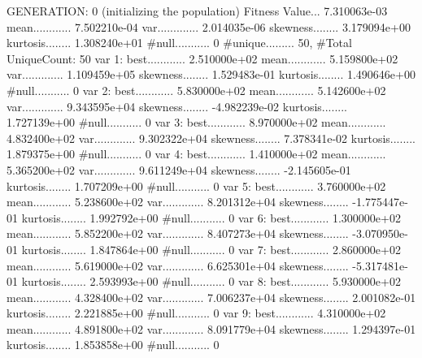 \documentclass[oneside,letterpaper,titlepage]{article}
\begin{document}
\begin{Schunk}
\begin{Soutput}
GENERATION: 0 (initializing the population)
Fitness Value... 7.310063e-03
mean............ 7.502210e-04
var............. 2.014035e-06
skewness........ 3.179094e+00
kurtosis........ 1.308240e+01
#null........... 0
#unique......... 50, #Total UniqueCount: 50
var 1:
best............ 2.510000e+02
mean............ 5.159800e+02
var............. 1.109459e+05
skewness........ 1.529483e-01
kurtosis........ 1.490646e+00
#null........... 0
var 2:
best............ 5.830000e+02
mean............ 5.142600e+02
var............. 9.343595e+04
skewness........ -4.982239e-02
kurtosis........ 1.727139e+00
#null........... 0
var 3:
best............ 8.970000e+02
mean............ 4.832400e+02
var............. 9.302322e+04
skewness........ 7.378341e-02
kurtosis........ 1.879375e+00
#null........... 0
var 4:
best............ 1.410000e+02
mean............ 5.365200e+02
var............. 9.611249e+04
skewness........ -2.145605e-01
kurtosis........ 1.707209e+00
#null........... 0
var 5:
best............ 3.760000e+02
mean............ 5.238600e+02
var............. 8.201312e+04
skewness........ -1.775447e-01
kurtosis........ 1.992792e+00
#null........... 0
var 6:
best............ 1.300000e+02
mean............ 5.852200e+02
var............. 8.407273e+04
skewness........ -3.070950e-01
kurtosis........ 1.847864e+00
#null........... 0
var 7:
best............ 2.860000e+02
mean............ 5.619000e+02
var............. 6.625301e+04
skewness........ -5.317481e-01
kurtosis........ 2.593993e+00
#null........... 0
var 8:
best............ 5.930000e+02
mean............ 4.328400e+02
var............. 7.006237e+04
skewness........ 2.001082e-01
kurtosis........ 2.221885e+00
#null........... 0
var 9:
best............ 4.310000e+02
mean............ 4.891800e+02
var............. 8.091779e+04
skewness........ 1.294397e-01
kurtosis........ 1.853858e+00
#null........... 0


\end{Soutput}
\end{Schunk}
\end{document}
